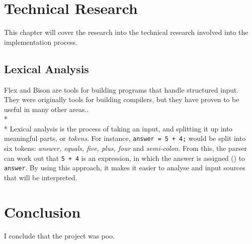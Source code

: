 \documentclass[10pt]{report}
\begin{document}
\chapter{Technical Research}
This chapter will cover the research into the technical research involved into the implementation process.
\section{Lexical Analysis}\label{sec:lexical_analysis}
Flex and Bison are tools for building programs that handle structured input.  They were originally tools for building compilers, but they have proven to be useful in many other areas.\citep{flexandbison09}.
\\*
\\*
Lexical analysis is the process of taking an input, and splitting it up into meaningful parts, or \textit{tokens}.  For instance, \texttt{answer = 5 + 4;} would be split into six tokens: \textit{answer, equals, five, plus, four} and \textit{semi-colon}.  From this, the parser can work out that \texttt{5 + 4} is an expression, in which the answer is assigned (\textt{=}) to \texttt{answer}.  By using this approach, it makes it easier to analyse and input sources that will be interpreted.


\chapter{Conclusion}
I conclude that the project was poo.



\end{document}
